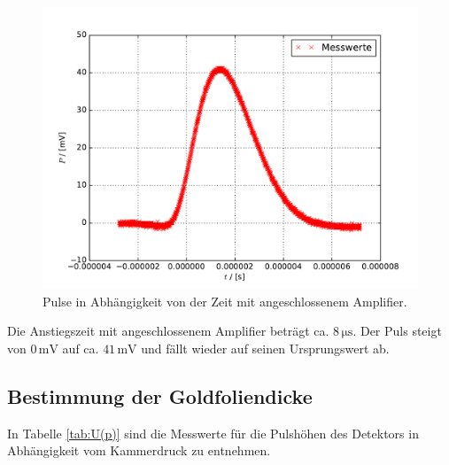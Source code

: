 \begin{figure}[H]
  \centering
  \includegraphics[width=\textwidth]{osz1.pdf}
  \caption{Pulse in Abhängigkeit von der Zeit mit angeschlossenem Amplifier.}
  \label{fig:1}
\end{figure}

Die Anstiegszeit mit angeschlossenem Amplifier beträgt ca. $8\,\si{\micro\second}$.
Der Puls steigt von $0\,\text{mV}$ auf ca. $41\,\text{mV}$ und fällt wieder auf seinen Ursprungswert ab.

\subsection{Bestimmung der Goldfoliendicke}
\label{gofodi}

In Tabelle \ref{tab:U(p)} sind die Messwerte für die Pulshöhen des Detektors in Abhängigkeit vom Kammerdruck zu entnehmen.

